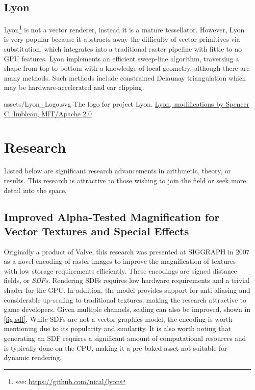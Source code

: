 \subsection{Lyon}\label{sec:lyon_lit}
Lyon\footnote{see: \href{https://github.com/nical/lyon}{https://github.com/nical/lyon}} is not a vector renderer, instead it is a mature tessellator. However, Lyon is very popular because it abstracts away the difficulty of vector primitives via substitution, which integrates into a traditional raster pipeline with little to no GPU features\cite{Lyon}. Lyon implements an efficient sweep-line algorithm, traversing a shape from top to bottom with a knowledge of local geometry\cite{Lyon_Sweep}, although there are many methods. Such methods include constrained Delaunay triangulation\cite{Chew87} which may be hardware-accelerated\cite{Qi12} and ear clipping\cite{Eberly02}.\medskip

\smallsvg
{assets/Lyon_Logo.svg}
{The logo for project Lyon.}
{\href{https://github.com/nical/lyon}{Lyon, modifications by Spencer C. Imbleau, MIT/Apache 2.0}}
\medskip

\section{Research}
Listed below are significant research advancements in arithmetic, theory, or results. This research is attractive to those wishing to join the field or seek more detail into the space.

\subsection{Improved Alpha-Tested Magnification for Vector Textures and Special Effects}\cite{Green07}

Originally a product of Valve, this research was presented at SIGGRAPH in 2007 as a novel encoding of raster images to improve the magnification of textures with low storage requirements efficiently. These encodings are signed distance fields, or \emph{SDFs}. Rendering SDFs requires low hardware requirements and a trivial shader for the GPU. In addition, the model provides support for anti-aliasing and considerable up-scaling to traditional textures, making the research attractive to game developers. Given multiple channels, scaling can also be improved\cite{Chlumsky17}, shown in \cref{fig:sdf}. While SDFs are not a vector graphics model, the encoding is worth mentioning due to its popularity and similarity. It is also worth noting that generating an SDF requires a significant amount of computational resources and is typically done on the CPU, making it a pre-baked asset not suitable for dynamic rendering.\medskip

